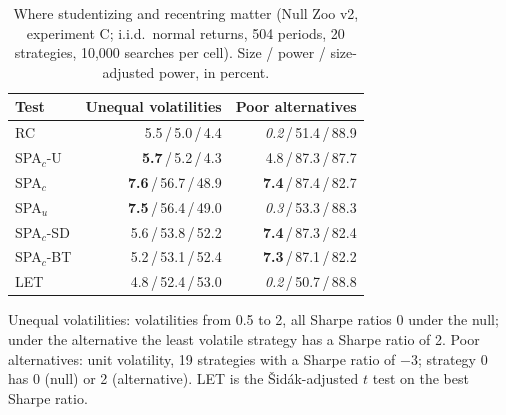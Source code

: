 \begin{table}[t]
\centering
\small
\caption{Where studentizing and recentring matter (Null Zoo v2, experiment C; i.i.d.\ normal returns, 504 periods, 20 strategies, 10,000 searches per cell). Size / power / size-adjusted power, in percent.}
\label{tab:fair}
\begin{tabular}{lrr}
\toprule
Test & Unequal volatilities & Poor alternatives \\
\midrule
RC & 5.5\,/\,5.0\,/\,4.4 & \textit{0.2}\,/\,51.4\,/\,88.9 \\
SPA$_c$-U & \textbf{5.7}\,/\,5.2\,/\,4.3 & 4.8\,/\,87.3\,/\,87.7 \\
SPA$_c$ & \textbf{7.6}\,/\,56.7\,/\,48.9 & \textbf{7.4}\,/\,87.4\,/\,82.7 \\
SPA$_u$ & \textbf{7.5}\,/\,56.4\,/\,49.0 & \textit{0.3}\,/\,53.3\,/\,88.3 \\
SPA$_c$-SD & 5.6\,/\,53.8\,/\,52.2 & \textbf{7.4}\,/\,87.3\,/\,82.4 \\
SPA$_c$-BT & 5.2\,/\,53.1\,/\,52.4 & \textbf{7.3}\,/\,87.1\,/\,82.2 \\
LET & 4.8\,/\,52.4\,/\,53.0 & \textit{0.2}\,/\,50.7\,/\,88.8 \\
\bottomrule
\end{tabular}
\par\smallskip\begin{minipage}{0.97\linewidth}\footnotesize Unequal volatilities: volatilities from 0.5 to 2, all Sharpe ratios 0 under the null; under the alternative the least volatile strategy has a Sharpe ratio of 2. Poor alternatives: unit volatility, 19 strategies with a Sharpe ratio of $-3$; strategy 0 has 0 (null) or 2 (alternative). LET is the \v{S}id\'ak-adjusted $t$ test on the best Sharpe ratio.\end{minipage}
\end{table}

